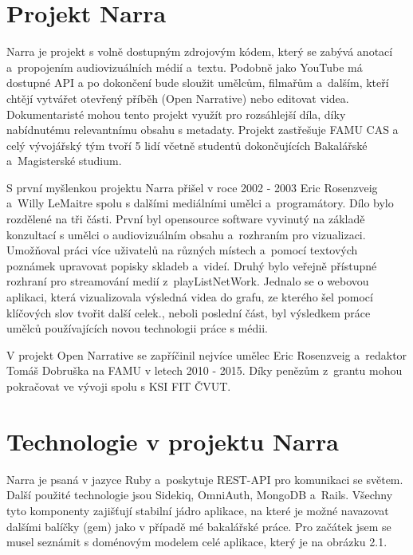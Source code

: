 \section{Projekt Narra}
\par Narra je projekt s volně dostupným zdrojovým kódem, který se zabývá anotací a~propojením audiovizuálních médií a~textu. Podobně jako YouTube má dostupné API a po dokončení bude sloužit umělcům, filmařům a~dalším, kteří chtějí vytvářet otevřený příběh (Open Narrative) nebo editovat videa. Dokumentaristé mohou tento projekt využít pro rozsáhlejší díla, díky nabídnutému relevantnímu obsahu s metadaty. Projekt zastřešuje FAMU CAS a celý vývojářský tým tvoří 5 lidí včetně studentů dokončujících Bakalářské a~Magisterské studium.
\par S první myšlenkou projektu Narra přišel v roce 2002 - 2003 Eric Rosenzveig a~Willy LeMaitre spolu s dalšími mediálními umělci a~programátory. Dílo bylo rozdělené na tři části. První byl opensource software vyvinutý na základě konzultací s umělci o audiovizuálním obsahu a~rozhraním pro vizualizaci. Umožňoval práci více uživatelů na různých místech a~pomocí textových poznámek upravovat popisky skladeb a~videí. Druhý bylo veřejně přístupné rozhraní pro streamování medií z~playListNetWork. Jednalo se o webovou aplikaci, která vizualizovala výsledná videa do grafu, ze kterého šel pomocí klíčových slov tvořit další celek., neboli poslední část, byl výsledkem práce umělců používajících novou technologii práce s médii.
\par V projekt Open Narrative se zapříčinil nejvíce umělec Eric Rosenzveig a~redaktor Tomáš Dobruška na FAMU v letech 2010 - 2015. Díky penězům z~grantu mohou pokračovat ve vývoji spolu s KSI FIT ČVUT.

\section{Technologie v projektu Narra} 
\par Narra je psaná v jazyce Ruby a~poskytuje REST-API pro komunikaci se světem. Další použité technologie jsou Sidekiq, OmniAuth, MongoDB a~Rails. Všechny tyto komponenty zajišťují stabilní jádro aplikace, na které je možné navazovat dalšími balíčky (gem) jako v případě mé bakalářské práce. Pro začátek jsem se musel seznámit s doménovým modelem celé aplikace, který je na obrázku 2.1.

